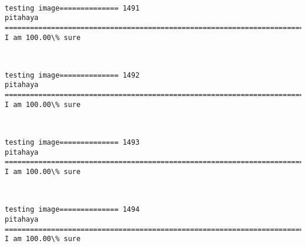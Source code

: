 \documentclass[11pt]{article}
\begin{document}
    \begin{center}
    \end{center}
    { \hspace*{\fill} \\}
    
    \begin{Verbatim}[commandchars=\\\{\}]
testing image============== 1491
pitahaya
============================================================================
I am 100.00\% sure

    \end{Verbatim}

    \begin{center}
    \end{center}
    { \hspace*{\fill} \\}
    
    \begin{Verbatim}[commandchars=\\\{\}]
testing image============== 1492
pitahaya
============================================================================
I am 100.00\% sure

    \end{Verbatim}

    \begin{center}
    \end{center}
    { \hspace*{\fill} \\}
    
    \begin{Verbatim}[commandchars=\\\{\}]
testing image============== 1493
pitahaya
============================================================================
I am 100.00\% sure

    \end{Verbatim}

    \begin{center}
    \end{center}
    { \hspace*{\fill} \\}
    
    \begin{Verbatim}[commandchars=\\\{\}]
testing image============== 1494
pitahaya
============================================================================
I am 100.00\% sure

    \end{Verbatim}
\end{document}

